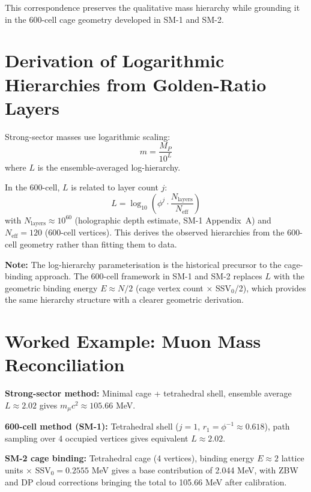\documentclass[11pt]{article}
\begin{document}
This correspondence preserves the qualitative mass hierarchy while
grounding it in the 600-cell cage geometry developed in SM-1 and SM-2.

\section{Derivation of Logarithmic Hierarchies from Golden-Ratio Layers}

Strong-sector masses use logarithmic scaling:
\begin{equation}
m = \frac{M_P}{10^{L}}
\end{equation}
where $L$ is the ensemble-averaged log-hierarchy.

In the 600-cell, $L$ is related to layer count $j$:
\begin{equation}
L = \log_{10}\!\left( \phi^j \cdot \frac{N_{\text{layers}}}{N_{\text{eff}}} \right)
\end{equation}
with $N_{\text{layers}} \approx 10^{60}$ (holographic depth estimate,
SM-1 Appendix~A) and $N_{\text{eff}} = 120$ (600-cell vertices). This
derives the observed hierarchies from the 600-cell geometry rather than
fitting them to data.

\textbf{Note:} The log-hierarchy parameterisation is the historical
precursor to the cage-binding approach. The 600-cell framework in SM-1
and SM-2 replaces $L$ with the geometric binding energy $E \approx N/2$
(cage vertex count × SSV$_0$/2), which provides the same hierarchy
structure with a clearer geometric derivation.

\section{Worked Example: Muon Mass Reconciliation}

\textbf{Strong-sector method:} Minimal cage + tetrahedral shell, ensemble
average $L \approx 2.02$ gives $m_\mu c^2 \approx 105.66$ MeV.

\textbf{600-cell method (SM-1):} Tetrahedral shell ($j = 1$,
$r_1 = \phi^{-1} \approx 0.618$), path sampling over 4 occupied vertices
gives equivalent $L \approx 2.02$.

\textbf{SM-2 cage binding:} Tetrahedral cage (4 vertices), binding
energy $E \approx 2$ lattice units $\times$ SSV$_0 = 0.2555$ MeV gives
a base contribution of 2.044 MeV, with ZBW and DP cloud corrections
bringing the total to 105.66 MeV after calibration.
\end{document}
